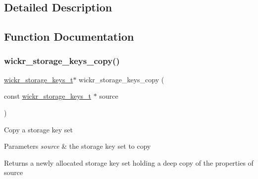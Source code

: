\subsection{Detailed Description}


\subsection{Function Documentation}
\mbox{\label{group__wickr__storage__keys_gad6839a21bca1c28775d51deb6b7c3835}} 
\subsubsection{\texorpdfstring{wickr\+\_\+storage\+\_\+keys\+\_\+copy()}{wickr\_storage\_keys\_copy()}}
{\footnotesize\ttfamily \hyperlink{structwickr__storage__keys}{wickr\+\_\+storage\+\_\+keys\+\_\+t}$\ast$ wickr\+\_\+storage\+\_\+keys\+\_\+copy (\begin{DoxyParamCaption}\item[{const \hyperlink{structwickr__storage__keys}{wickr\+\_\+storage\+\_\+keys\+\_\+t} $\ast$}]{source }\end{DoxyParamCaption})}

Copy a storage key set


\begin{DoxyParams}{Parameters}
{\em source} & the storage key set to copy \\
\hline
\end{DoxyParams}
\begin{DoxyReturn}{Returns}
a newly allocated storage key set holding a deep copy of the properties of \textquotesingle{}source\textquotesingle{} 
\end{DoxyReturn}
\mbox{\label{group__wickr__storage__keys_gad03ddd5ea10633ca35097e5f4707d5cb}} 
